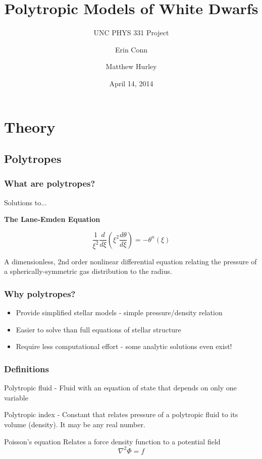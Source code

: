 \documentclass{beamer}
\title[Polytropes] %
{Polytropic Models of White Dwarfs}
\subtitle{UNC PHYS 331 Project}
\author[Conn, Hurley] %
{Erin Conn \and Matthew Hurley}
\date{April 14, 2014}
\begin{document}
    \frame{\titlepage}

    \section{Theory}

        \subsection{Polytropes}

        \begin{frame}
            \frametitle{What are polytropes?}
            
            \pause
            Solutions to...

            \textbf{The Lane-Emden Equation}

            \[
                \frac{1}{\xi^2}\frac{d}{d\xi}\left(\xi^2\frac{d\theta}{d\xi}\right)=-\theta^n(\xi)
            \]

            A dimensionless, 2nd order nonlinear differential equation relating the
            pressure of a spherically-symmetric gas distribution to the radius.

        \end{frame}

        \begin{frame}
            \frametitle{Why polytropes?}

            \begin{itemize}
                \item Provide simplified stellar models - simple pressure/density relation
                    \pause
                \item Easier to solve than full equations of stellar structure
                    \pause
                \item Require less computational effort - some analytic solutions even exist!
            \end{itemize}

        \end{frame}

        \begin{frame}
            \frametitle{Definitions}

            \begin{definition}
                \alert{Polytropic fluid} - Fluid with an equation of state that depends on only one variable
                
            \end{definition} 
                    \pause
            \begin{definition}
                \alert{Polytropic index} - Constant that relates pressure of a polytropic fluid to its volume (density). It may be any real number.
            \end{definition}
            \pause
            \begin{definition}
                \alert{Poisson's equation} Relates a force density function to a potential field
                    \[\nabla^2\Phi=f\]
            \end{definition}

        \end{frame}
\end{document}
